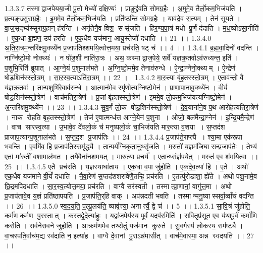 1.3.3.7
तस्माद्वाजपेयया॒जी पू॒तो मेध्यो॑ दक्षि॒ण्यः॑ । प्राङुद्द्र॑वति सोमग्र॒हैः । अ॒मुमे॒व तैर्लो॒कम॒भिज॑यति । प्र॒त्यङ्ख्सु॑राग्र॒हैः । इ॒ममे॒व तैर्लो॒कम॒भिज॑यति । प्रति॑ष्ठन्ति सोमग्र॒हैः । याव॑दे॒व स॒त्यम् । तेन॑ सूयते । वा॒ज॒सृद्भ्य॑स्सुराग्र॒हान् ह॑रन्ति । अनृ॑तेनै॒व विश॒॒ ससृ॑जति । हि॒र॒ण्य॒पा॒त्रं मधोपू॒र्णं द॑दाति । म॒ध॒व्यो॑ऽसा॒नीति॑ । ए॒क॒धा ब्र॒ह्मण॒ उप॑ हरति । ए॒क॒धैव यज॑मान॒ आयु॒स्तेजो॑ दधाति ।। 21 ।।
1.3.4.0
अ॒ति॒रा॒त्रम॒न्तरि॑क्षमु॒क्थ्ये॑न प्र॒जाप॑तिश्शमयि॒त्वोत्त॒मया॒ प्रच॑रति॒ षट् च॑ ।। 4 ।।
1.3.4.1
ब्र॒ह्म॒वा॒दिनो॑ वदन्ति । नाग्नि॑ष्टो॒मो नोक्थ्यः॑ । न षो॑ड॒शी नाति॑रा॒त्रः । अथ॒ कस्माद्वाज॒पेये॒ सर्वे॑ यज्ञक्र॒तवोऽव॑रुध्यन्त॒ इति॑ । प॒शुभि॒रिति॑ ब्रूयात् । आ॒ग्ने॒यं प॒शुमाल॑भते । अ॒ग्नि॒ष्टो॒ममे॒व तेनाव॑रुन्धे । ऐ॒न्द्रा॒ग्नेनो॒क्थ्यम् । ऐ॒न्द्रेण॑ षोड॒शिन॑स्स्तो॒त्रम् । सा॒र॒स्व॒त्याऽति॑रा॒त्रम् ।। 22 ।।
1.3.4.2
मा॒रु॒त्या बृ॑ह॒तस्स्तो॒त्रम् । ए॒ताव॑न्तो॒ वै य॑ज्ञक्र॒तवः॑ । तान्प॒शुभि॑रे॒वाव॑रुन्धे । आ॒त्मान॑मे॒व स्पृ॑णोत्यग्निष्टो॒मेन॑ । प्रा॒णा॒पा॒नावु॒क्थ्ये॑न । वी॒र्य॑ षोड॒शिन॑स्स्तो॒त्रेण॑ । वाच॑मतिरा॒त्रेण॑ । प्र॒जां बृ॑ह॒तस्स्तो॒त्रेण॑ । इ॒ममे॒व लो॒कम॒भिज॑यत्यग्निष्टो॒मेन॑ । अ॒न्तरि॑क्षमु॒क्थ्ये॑न ।। 23 ।।
1.3.4.3
सु॒व॒र्गं लो॒क षो॑ड॒शिन॑स्स्तो॒त्रेण॑ । दे॒व॒याना॑ने॒व प॒थ आरो॑हत्यतिरा॒त्रेण॑ । नाक॑ रोहति बृह॒तस्स्तो॒त्रेण॑ । तेज॑ ए॒वात्मन्ध॑त्त आग्ने॒येन॑ प॒शुना । ओजो॒ बल॑मैन्द्रा॒ग्नेन॑ । इ॒न्द्रि॒यमै॒न्द्रेण॑ । वाच॑ सारस्व॒त्या । उ॒भावे॒व दे॑वलो॒कं च॑ मनुष्यलो॒कं चा॒भिज॑यति मारु॒त्या व॒शया । स॒प्तद॑श प्राजाप॒त्यान्प॒शूनाल॑भते । स॒प्त॒द॒श प्र॒जाप॑तिः ।। 24 ।।
1.3.4.4
प्र॒जाप॑ते॒राप्त्यै । श्या॒मा एक॑रूपा भवन्ति । ए॒वमि॑व॒ हि प्र॒जाप॑ति॒स्समृ॑द्ध्यै । तान्पर्य॑ग्निकृता॒नुथ्सृ॑जति । म॒रुतो॑ य॒ज्ञम॑जिघासन्प्र॒जाप॑तेः । तेभ्य॑ ए॒तां मा॑रु॒तीं व॒शामाल॑भत । तयै॒वैना॑नशमयत् । मा॒रु॒त्या प्र॒चर्य॑ । ए॒तान्थ्संज्ञ॑पयेत् । म॒रुत॑ ए॒व श॑मयि॒त्वा ।। 25 ।।
1.3.4.5
ए॒तै प्रच॑रति । य॒ज्ञस्याघा॑ताय । ए॒क॒धा व॒पा जु॑होति । ए॒क॒दे॒व॒त्या॑ हि । ए॒ते । अथो॑ एक॒धैव यज॑माने वी॒र्यं॑ दधाति । नै॒वा॒रेण॑ स॒प्तद॑शशरावेणै॒तऱ्हि॒ प्रच॑रति । ए॒तत्पु॑रोडाशा॒ ह्ये॑ते । अथो॑ पशू॒नामे॒व छि॒द्रमपि॑दधाति । सा॒र॒स्व॒त्योत्त॒मया॒ प्रच॑रति । वाग्वै सर॑स्वती । तस्मात्प्रा॒णानां॒ वागु॑त्त॒मा । अथो प्र॒जाप॑तावे॒व य॒ज्ञं प्रति॑ष्ठापयति । प्र॒जाप॑ति॒र्‌हि वाक् । अप॑न्नदती भवति । तस्मान्मनु॒ष्यास्सर्वा॒व्वाँचं॑ वदन्ति ।। 26 ।।
1.3.5.0
स्व॒द॒य॒ति॒ प॒ल्पू॒लय॑ति॒ व्यावृ॑त्त्या॒ अनार्त्यै॒ द्वे च॑ ।। 5 ।।
1.3.5.1
सा॒वि॒त्रं जु॑होति॒ कर्म॑णकर्मण पु॒रस्तात् । कस्तद्वे॒देत्या॑हुः । यद्वा॑ज॒पेय॑स्य॒ पूर्वं॒ यदप॑र॒मिति॑ । स॒वि॒तृप्र॑सूत ए॒व य॑थापू॒र्वं कर्मा॑णि करोति । सव॑नेसवने जुहोति । आ॒क्रम॑णमे॒व तथ्सेतुं॒ यज॑मान कुरुते । सु॒व॒र्गस्य॑ लो॒कस्य॒ सम॑ष्ट्यै । वा॒चस्पति॒र्वाच॑म॒द्य स्व॑दाति न॒ इत्या॑ह । वाग्वै दे॒वानां पु॒राऽन्न॑मासीत् । वाच॑मे॒वास्मा॒ अन्न॑ स्वदयति ।। 27 ।।
